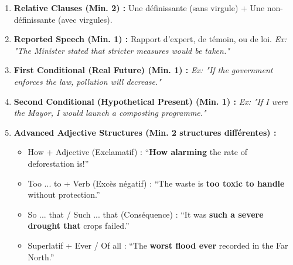 \documentclass[11pt]{article}
\newcommand{\cle}[1]{{\popxbold\color{popdark}#1}}
\begin{document}
\begin{definition}
\begin{enumerate}
    \item \textbf{\cle{Relative Clauses} (Min. 2) :} Une définissante (sans virgule) + Une non-définissante (avec virgules).
    \item \textbf{\cle{Reported Speech} (Min. 1) :} Rapport d'expert, de témoin, ou de loi. \textit{Ex: "The Minister stated that stricter measures would be taken."}
    \item \textbf{\cle{First Conditional} (Real Future) (Min. 1) :} \textit{Ex: "If the government enforces the law, pollution will decrease."}
    \item \textbf{\cle{Second Conditional} (Hypothetical Present) (Min. 1) :} \textit{Ex: "If I were the Mayor, I would launch a composting programme."}
    \item \textbf{\cle{Advanced Adjective Structures} (Min. 2 structures différentes) :}
    \begin{itemize}
        \item \cle{How + Adjective} (Exclamatif) : ``\textbf{How alarming} the rate of deforestation is!''
        \item \cle{Too ... to + Verb} (Excès négatif) : ``The waste is \textbf{too toxic to handle} without protection.''
        \item \cle{So ... that / Such ... that} (Conséquence) : ``It was \textbf{such a severe drought that} crops failed.''
        \item \cle{Superlatif + Ever / Of all} : ``The \textbf{worst flood ever} recorded in the Far North.''
    \end{itemize}
\end{enumerate}
\end{definition}
\end{document}
